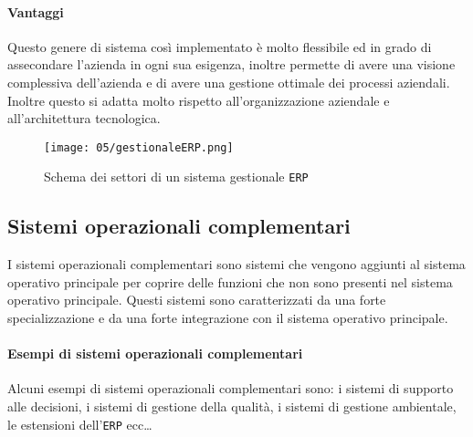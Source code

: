         \paragraph{Vantaggi} Questo genere di sistema così implementato è molto flessibile ed in grado di assecondare l'azienda in ogni sua esigenza, inoltre permette di avere una visione complessiva dell'azienda e di avere una gestione ottimale dei processi aziendali. Inoltre questo si adatta molto rispetto all'organizzazione aziendale e all'architettura tecnologica.
        \begin{figure}[H]
            \centering
            \texttt{[image: 05/gestionaleERP.png]}
            \caption{Schema dei settori di un sistema gestionale \texttt{ERP}}
        \end{figure}
    \subsection{Sistemi operazionali complementari}
        I sistemi operazionali complementari sono sistemi che vengono aggiunti al sistema operativo principale per coprire delle funzioni che non sono presenti nel sistema operativo principale. Questi sistemi sono caratterizzati da una forte specializzazione e da una forte integrazione con il sistema operativo principale.
        \paragraph{Esempi di sistemi operazionali complementari} Alcuni esempi di sistemi operazionali complementari sono: i sistemi di supporto alle decisioni, i sistemi di gestione della qualità, i sistemi di gestione ambientale, le estensioni dell'\texttt{ERP} ecc\dots